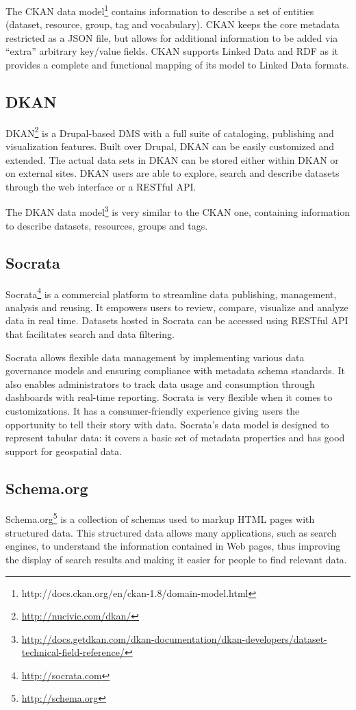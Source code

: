 The CKAN data model\footnote{http://docs.ckan.org/en/ckan-1.8/domain-model.html} contains information to describe a set of entities (dataset, resource, group, tag and vocabulary). CKAN keeps the core metadata restricted as a JSON file, but allows for additional information to be added via ``extra'' arbitrary key/value fields. CKAN supports Linked Data and RDF as it provides a complete and functional mapping of its model to Linked Data formats.

\subsection{DKAN}
DKAN\footnote{\url{http://nucivic.com/dkan/}} is a Drupal-based DMS with a full suite of cataloging, publishing and visualization features. Built over Drupal, DKAN can be easily customized and extended. The actual data sets in DKAN can be stored either within DKAN or on external sites. DKAN users are able to explore, search and describe datasets through the web interface or a RESTful API.

The DKAN data model\footnote{\url{http://docs.getdkan.com/dkan-documentation/dkan-developers/dataset-technical-field-reference/}} is very similar to the CKAN one, containing information to describe datasets, resources, groups and tags.

\subsection{Socrata}
Socrata\footnote{\url{http://socrata.com}} is a commercial platform to streamline data publishing, management, analysis and reusing. It empowers users to review, compare, visualize and analyze data in real time. Datasets hosted in Socrata can be accessed using RESTful API that facilitates search and data filtering.

Socrata allows flexible data management by implementing various data governance models and ensuring compliance with metadata schema standards. It also enables administrators to track data usage and consumption through dashboards with real-time reporting. Socrata is very flexible when it comes to customizations. It has a consumer-friendly experience giving users the opportunity to tell their story with data. Socrata's data model is designed to represent tabular data: it covers a basic set of metadata properties and has good support for geospatial data.

\subsection{Schema.org}
Schema.org\footnote{\url{http://schema.org}} is a collection of schemas used to markup HTML pages with structured data. This structured data allows many applications, such as search engines, to understand the information contained in Web pages, thus improving the display of search results and making it easier for people to find relevant data.

